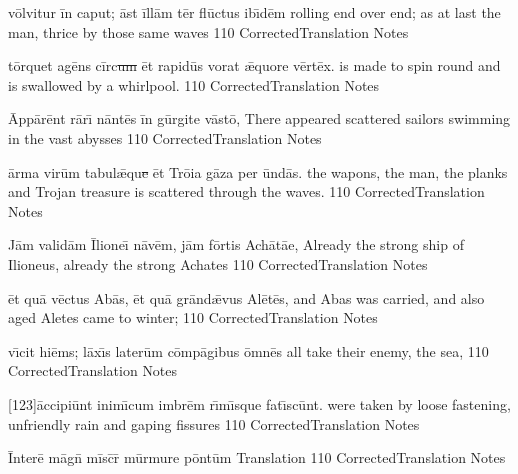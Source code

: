 \documentclass[]{book}
\begin{document}
	\newpage

	\latline
	  {v\=olv\-it\-ur \=in c\-ap\-ut; \=ast \=ill\=am t\=er fl\={\macron u}ct\-us \-ib\={\macron \i}d\=em}
	  { rolling end over end; as at last the man, thrice by those same waves  }
	  {110}
	  { CorrectedTranslation }
	  { Notes }


	\latline
	  {t\=orqu\-et \-ag\={\macron e}ns c\=irc\sout{um }\=et r\-ap\-id\=us v\-or\-at \={\ae}qu\-or\-e v\=ert\=ex.}
	  { is made to spin round and is swallowed by a whirlpool. }
	  {110}
	  { CorrectedTranslation }
	  { Notes }


	\latline
	  {\=App\={\macron a}r\=ent r\={\macron a}r\={\macron \i} n\=ant\={\macron e}s \=in g\=urg\-it\-e v\=ast\={\macron o},}
	  { There appeared scattered sailors swimming in the vast abysses }
	  {110}
	  { CorrectedTranslation }
	  { Notes }


	\newpage

	\latline
	  {\=arm\-a v\-ir\=um t\-ab\-ul\={\ae}qu\sout{e }\=et Tr\={\macron o}\-i\-a g\=az\-a p\-er \=und\={\macron a}s.}
	  { the wapons, the man, the planks and Trojan treasure is scattered through the waves. }
	  {110}
	  { CorrectedTranslation }
	  { Notes }


	\latline
	  {J\=am v\-al\-id\=am \={\macron I}lione\={\macron \i} n\={\macron a}v\=em, j\=am f\=ort\-is \-Ach\={\macron a}t\={ae},}
	  { Already the strong ship of Ilioneus, already the strong Achates }
	  {110}
	  { CorrectedTranslation }
	  { Notes }


	\latline
	  {\=et qu\={\macron a} v\=ect\-us \-Ab\={\macron a}s, \=et qu\={\macron a} gr\=and\={\ae}v\-us \-Al\={\macron e}t\={\macron e}s,}
	  { and Abas was carried, and also aged Aletes came to winter;  }
	  {110}
	  { CorrectedTranslation }
	  { Notes }


	\newpage

	\latline
	  {v\={\macron \i}c\-it h\-i\=ems; l\=ax\={\macron \i}s l\-at\-er\=um c\=omp\={\macron a}g\-ib\-us \=omn\={\macron e}s}
	  { all  take their enemy, the sea, }
	  {110}
	  { CorrectedTranslation }
	  { Notes }


	\latline
	  {[123]\=acc\-ip\-i\=unt \-in\-im\={\macron \i}c\-um \-imbr\=em r\={\macron \i}m\={\macron \i}squ\-e f\-at\={\macron \i}sc\=unt.}
	  {  were taken by loose fastening, unfriendly rain and gaping fissures }
	  {110}
	  { CorrectedTranslation }
	  { Notes }

%

\newpage
\latline
  {\=Int\-er\-e\={} m\=agn\={} m\=isc\={}r\={\macron {\i}} m\=urm\-ur\-e p\=ont\=um}
  { Translation }
  {110}
  { CorrectedTranslation }
  { Notes }
\end{document}
